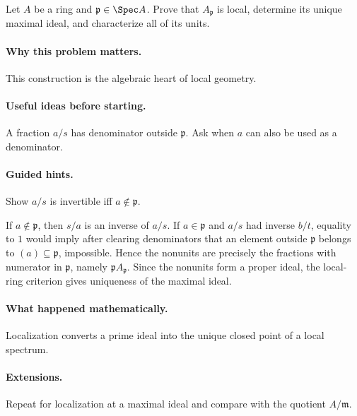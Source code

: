 \begin{problem}
Let $A$ be a ring and $\mathfrak p\in\Spec A$.  Prove that $A_{\mathfrak p}$ is local, determine its unique maximal ideal, and characterize all of its units.
\end{problem}

\paragraph{Why this problem matters.}
This construction is the algebraic heart of local geometry.

\paragraph{Useful ideas before starting.}
A fraction $a/s$ has denominator outside $\mathfrak p$.  Ask when $a$ can also be used as a denominator.

\paragraph{Guided hints.}
Show $a/s$ is invertible iff $a\notin\mathfrak p$.

\begin{solution}
If $a\notin\mathfrak p$, then $s/a$ is an inverse of $a/s$.  If $a\in\mathfrak p$ and $a/s$ had inverse $b/t$, equality to $1$ would imply after clearing denominators that an element outside $\mathfrak p$ belongs to $(a)\subseteq\mathfrak p$, impossible.  Hence the nonunits are precisely the fractions with numerator in $\mathfrak p$, namely $\mathfrak pA_{\mathfrak p}$.  Since the nonunits form a proper ideal, the local-ring criterion gives uniqueness of the maximal ideal.
\end{solution}

\paragraph{What happened mathematically.}
Localization converts a prime ideal into the unique closed point of a local spectrum.

\paragraph{Extensions.}
Repeat for localization at a maximal ideal and compare with the quotient $A/\mathfrak m$.
